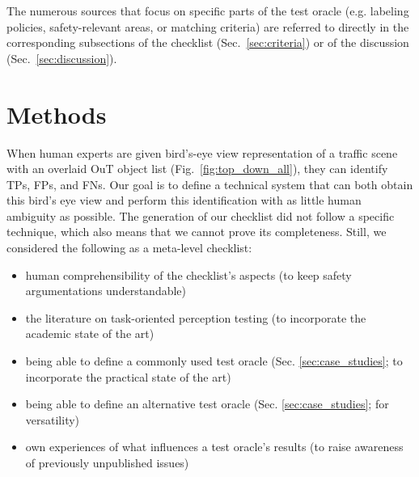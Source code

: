 \documentclass[conference]{IEEEtran}
\begin{document}
The numerous sources that focus on specific parts of the test oracle (e.g. labeling policies, safety-relevant areas, or matching criteria) are referred to directly in the corresponding subsections of the checklist (Sec.~\ref{sec:criteria}) or of the discussion (Sec.~\ref{sec:discussion}).




\section{Methods}
\label{sec:method}


When human experts are given bird's-eye view representation of a traffic scene with an overlaid OuT object list (Fig.~\ref{fig:top_down_all}), they can identify TPs, FPs, and FNs.
Our goal is to define a technical system that can both obtain this bird's eye view and perform this identification with as little human ambiguity as possible.
The generation of our checklist did not follow a specific technique, which also means that we cannot prove its completeness. 
Still, we considered the following as a meta-level checklist:
\begin{itemize}
\item human comprehensibility of the checklist's aspects \newline (to keep safety argumentations understandable)
\item the literature on task-oriented perception testing \newline (to incorporate the academic state of the art)
\item being able to define a commonly used test oracle \newline (Sec. \ref{sec:case_studies}; to incorporate the practical state of the art)
\item being able to define an alternative test oracle \newline (Sec. \ref{sec:case_studies}; for versatility)
\item own experiences of what influences a test oracle's results
(to raise awareness of previously unpublished issues)

\end{itemize}
\end{document}
